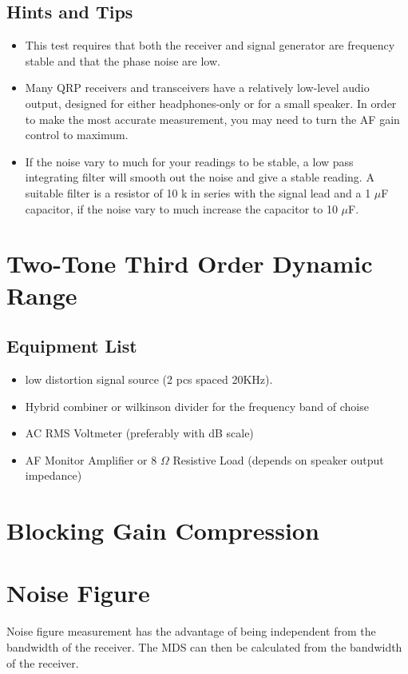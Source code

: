 \documentclass[10pt,letterpaper]{book}
\begin{document}
\subsection*{Hints and Tips}
\begin{itemize}
	\item This test requires that both the receiver and signal generator are frequency stable and that the phase noise are low.
	\item Many QRP receivers and transceivers have a relatively low-level audio output, designed for either headphones-only or for a small speaker. In order to make the most accurate measurement, you may need to turn the AF gain control to maximum.
	\item If the noise vary to much for your readings to be stable, a low pass integrating filter will smooth out the noise and give a stable reading. A suitable filter is a resistor of 10 k in series with the signal lead and a 1 $\mu$F capacitor, if the noise vary to much increase the capacitor to 10 $\mu$F.  
	
\end{itemize}
\newpage

\section{Two-Tone Third Order Dynamic Range}
\subsection*{Equipment List}
\begin{itemize}
	\item low distortion signal source (2 pcs spaced 20KHz).
	\item Hybrid combiner or wilkinson divider for the frequency band of choise
	\item AC RMS Voltmeter (preferably with dB scale)
	\item AF Monitor Amplifier or 8 $\Omega$ Resistive Load (depends on speaker output impedance)
\end{itemize}

\section{Blocking Gain Compression}
\newpage
\section{Noise Figure}
Noise figure measurement has the advantage of being independent from the bandwidth of the receiver. The MDS can then be calculated from the bandwidth of the receiver.
\end{document}
